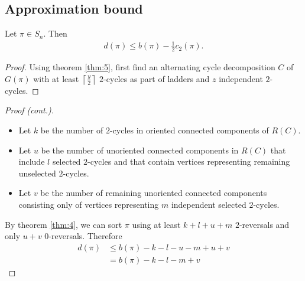 \documentclass{beamer}
\theoremstyle{definition}
\begin{document}
\subsection{Approximation bound}

\begin{frame}

\begin{theorem}
\label{thm:6}
Let $\pi \in S_n$. Then
\begin{align*}
    d(\pi) \leq b(\pi) - \frac{1}{2} c_2(\pi).
\end{align*}
\end{theorem}\pause

\begin{proof}\renewcommand{\qedsymbol}{}
Using theorem \ref{thm:5}, first find an alternating cycle decomposition $C$ of $G(\pi)$ with at least $\left\lceil \frac{y}{2} \right\rceil$ $2$-cycles as part of ladders and $z$ independent $2$-cycles.
\end{proof}

\end{frame}

\begin{frame}

\begin{proof}[Proof (cont.)]\renewcommand{\qedsymbol}{}
\begin{itemize}
    \item Let $k$ be the number of $2$-cycles in oriented connected components of $R(C)$.\pause
    \item Let $u$ be the number of unoriented connected components in $R(C)$ that include $l$ selected $2$-cycles and that contain vertices representing remaining unselected $2$-cycles.\pause
    \item Let $v$ be the number of remaining unoriented connected components consisting only of vertices representing $m$ independent selected $2$-cycles.
\end{itemize}\pause
By theorem \ref{thm:4}, we can sort $\pi$ using at least $k+l+u+m$ $2$-reversals and only $u+v$ $0$-reversals. \pause Therefore
\begin{align*}
    d(\pi) &\leq b(\pi) - k - l - u - m + u + v \\
           &= b(\pi) - k - l - m + v
\end{align*}
\end{proof}

\end{frame}
\end{document}
